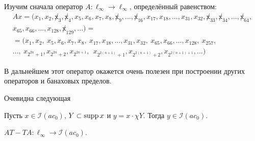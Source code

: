 Изучим сначала оператор $A:\ell_\infty\to\ell_\infty$,
определённый равенством:
\begin{multline}
	\label{eq:oper_A_throws_out_2power_blocks}
	Ax = (x_1, x_2, \not x_3, \not x_4, x_5, x_6, x_7, x_8, \not x_9, ..., \not x_{16}, x_{17}, x_{18}, ..., x_{31}, x_{32}, \not x_{33}, \not x_{34}, ..., \not x_{64},
	\\
	x_{65}, x_{66}, ..., x_{128}, \not x_{129}, ...)=
	\\=
	(x_1, x_2, \ x_5, x_6, x_7, x_8, \ x_{17}, x_{18}, ..., x_{31}, x_{32}, \ x_{65}, x_{66}, ..., x_{128}, \ x_{257},
	\\
	..., \ x_{2^{2n} +1}, x_{2^{2n} +2},  x_{2^{2n+1}}, \ \ x_{2^{2(n+1)} +1},  x_{2^{2(n+1)} +2},  x_{2^{2(n+1)+1}}, ...)
\end{multline}

В дальнейшем этот оператор окажется очень полезен при построении других операторов и банаховых пределов.

Очевидна следующая

\begin{lemma}
	\label{lem:supp_I_ac0}
	Пусть $x\in \mathcal I(ac_0)$, $Y \subset \operatorname{supp} x$ и $y = x \cdot \chi Y$.
	Тогда $y \in \mathcal I(ac_0)$.
\end{lemma}


\begin{lemma}
	\label{lem:AT-TA}
	$AT - TA: \ell_\infty \to \mathcal{I}(ac_0)$.
\end{lemma}

